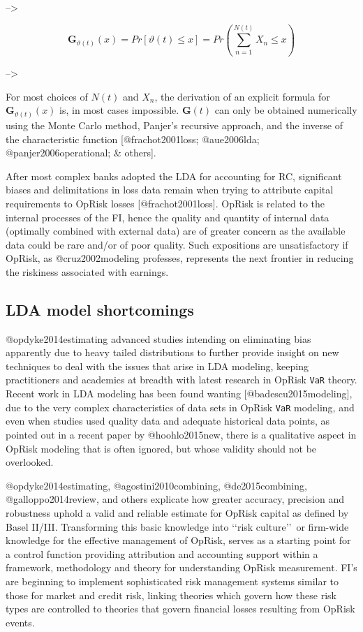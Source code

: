 \documentclass[]{article}
\begin{document}
--\textgreater{}

\begin{equation}\label{Compound_losses}
\mathbf{G}_{\vartheta(t)}(x)=Pr[\vartheta(t)\leq x]=Pr\left(\sum_{n=1}^{N(t)}X_{n} \leq x\right)
\end{equation}

--\textgreater{}

For most choices of \(N(t)\) and \(X_{n}\), the derivation of an
explicit formula for \(\mathbf{G}_{\vartheta(t)}(x)\) is, in most cases
impossible. \(\mathbf{G}(t)\) can only be obtained numerically using the
Monte Carlo method, Panjer's recursive approach, and the inverse of the
characteristic function {[}@frachot2001loss; @aue2006lda;
@panjer2006operational; \& others{]}. \medskip

After most complex banks adopted the LDA for accounting for RC,
significant biases and delimitations in loss data remain when trying to
attribute capital requirements to OpRisk losses {[}@frachot2001loss{]}.
OpRisk is related to the internal processes of the FI, hence the quality
and quantity of internal data (optimally combined with external data)
are of greater concern as the available data could be rare and/or of
poor quality. Such expositions are unsatisfactory if OpRisk, as
@cruz2002modeling professes, represents the next frontier in reducing
the riskiness associated with earnings.

\subsection{LDA model shortcomings}
\label{ssec:LDA model shortcomings}

@opdyke2014estimating advanced studies intending on eliminating bias
apparently due to heavy tailed distributions to further provide insight
on new techniques to deal with the issues that arise in LDA modeling,
keeping practitioners and academics at breadth with latest research in
OpRisk \texttt{VaR} theory. Recent work in LDA modeling has been found
wanting {[}@badescu2015modeling{]}, due to the very complex
characteristics of data sets in OpRisk \texttt{VaR} modeling, and even
when studies used quality data and adequate historical data points, as
pointed out in a recent paper by @hoohlo2015new, there is a qualitative
aspect in OpRisk modeling that is often ignored, but whose validity
should not be overlooked. \medskip

@opdyke2014estimating, @agostini2010combining, @de2015combining,
@galloppo2014review, and others explicate how greater accuracy,
precision and robustness uphold a valid and reliable estimate for OpRisk
capital as defined by Basel II/III. Transforming this basic knowledge
into \lq\lq risk culture\rq\rq~or firm-wide knowledge for the effective
management of OpRisk, serves as a starting point for a control function
providing attribution and accounting support within a framework,
methodology and theory for understanding OpRisk measurement. FI's are
beginning to implement sophisticated risk management systems similar to
those for market and credit risk, linking theories which govern how
these risk types are controlled to theories that govern financial losses
resulting from OpRisk events. \medskip
\end{document}
